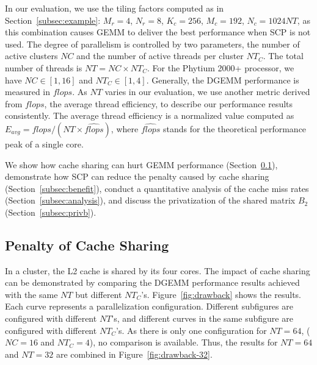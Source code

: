 In our evaluation, we use the tiling factors
computed as in Section~\ref{subsec:example}:
$M_r = 4$, $N_r = 8$, $K_c = 256$, $M_c = 192$, $N_c = 1024NT$,
as this combination causes GEMM to deliver the best performance 
when SCP is not used.
The degree of parallelism is controlled by two parameters,
the number of active clusters $NC$
and the number of active threads per cluster $NT_C$.
The total number of threads is $NT = NC \times NT_C$.
For the Phytium 2000+ processor, we have
$NC \in [1, 16]$ and $NT_C \in [1, 4]$. 
Generally, the DGEMM performance is measured in $flops$.
As $NT$ varies in our evaluation,
we use another metric derived from $flops$,
the average thread efficiency,
to describe our performance results consistently.
The average thread efficiency is a normalized value computed as
$E_{avg} = flops / (NT \times \widehat{flops})$,
where $\widehat{flops}$ stands for the theoretical performance
peak of a single core.

We show how cache sharing can hurt GEMM performance
(Section~\ref{subsec:drawback}),
demonstrate how SCP can reduce
the penalty caused by cache sharing 
(Section~\ref{subsec:benefit}), conduct a 
quantitative analysis of the cache miss rates
(Section~\ref{subsec:analysis}), and
discuss the privatization of the shared matrix $B_2$
(Section~\ref{subsec:privb}).

\subsection{Penalty of Cache Sharing}\label{subsec:drawback}

In a cluster, the L2 cache is shared by its four cores.
The impact of cache sharing can be demonstrated
by comparing the DGEMM performance results achieved
with the same $NT$
but different $NT_C$'s.
Figure~\ref{fig:drawback} shows the results.
Each curve represents a parallelization configuration.
Different subfigures are configured with different $NT$'s,
and different curves in the same subfigure are
configured with different $NT_C$'s.
As there is only one configuration for $NT=64$,
($NC=16$ and $NT_C=4$),
no comparison is available. Thus,
the results for $NT=64$ and $NT=32$ are combined in Figure~\ref{fig:drawback-32}.

